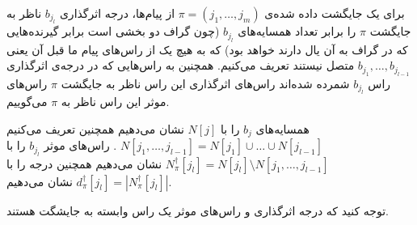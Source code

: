 \begin{definition}
	برای یک جایگشت داده شده‌ی 
	$\pi = (j_1, \ldots, j_m)$
	از پیام‌ها، درجه اثرگذاری
	$b_{j_l}$
	ناظر به جایگشت 
	$\pi$
	را برابر تعداد همسایه‌های 
	$b_{j_l}$
	(چون گراف دو بخشی است برابر گیرنده‌هایی که در گراف به آن یال دارند خواهد بود)	که به هیچ یک از راس‌‌های پیام ما قبل آن یعنی
	$b_{j_1}, \ldots, b_{j_{l - 1}}$
	متصل نیستند تعریف می‌کنیم. همچنین به راس‌هایی که در درجه‌ی اثرگذاری راس
		$b_{j_l}$
		شمرده شده‌اند راس‌های اثرگذاری این راس ناظر به جایگشت
		$\pi$
		راس‌های موثر این راس ناظر به
		$\pi$
		 می‌گوییم.
		 
		 همسایه‌های
		 $b_j$
		 را با
		 $N[j]$
		 نشان می‌دهیم همچنین تعریف می‌کنیم
		 $N[j_1, \ldots, j_{l - 1}] = N[j_1] \cup \ldots \cup N[j_{l - 1}]$
		 . راس‌های موثر
 		$b_{j_l}$
 		را با
 		$N^\dagger_\pi [j_l] = N[j_l] \setminus N[j_1, \ldots, j_{l - 1}]$
 		نشان می‌دهیم همچنین درجه را با
 		$d^\dagger_\pi[j_l] = |N^\dagger_\pi [j_l] |$
 		نشان می‌دهیم.
\end{definition}

توجه کنید که درجه اثرگذاری و راس‌های موثر یک راس وابسته به جایشگت هستند.

